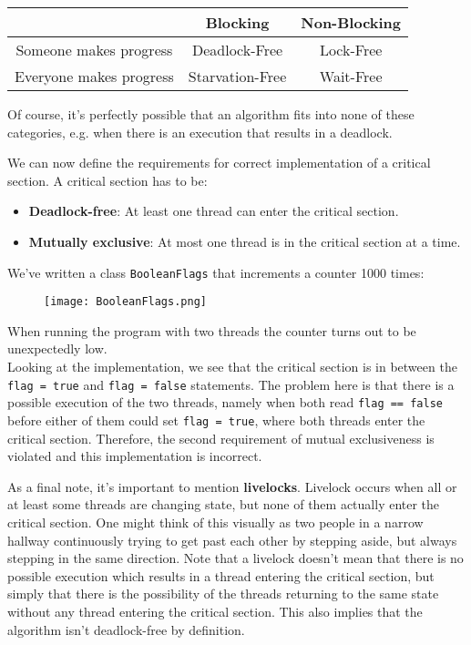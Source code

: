 \documentclass[main]{subfiles}
\begin{document}
\begin{center}
    \begin{tabular}{c|c|c}
         &  Blocking & Non-Blocking\\
         \hline
        Someone makes progress & Deadlock-Free & Lock-Free \\
        \hline
        Everyone makes progress & Starvation-Free & Wait-Free
    \end{tabular}
\end{center}
\noindent Of course, it's perfectly possible that an algorithm fits into none of these categories, e.g. when there is an execution that results in a deadlock.\clearpage

\noindent We can now define the requirements for correct implementation of a critical section. A critical section has to be:
\begin{itemize}
    \item \textbf{Deadlock-free}: At least one thread can enter the critical section.
    \item \textbf{Mutually exclusive}: At most one thread is in the critical section at a time.
\end{itemize}

\begin{example}
    We've written a class \texttt{BooleanFlags} that increments a counter 1000 times:
    \begin{figure}[H]
        \centering
        \texttt{[image: BooleanFlags.png]}
    \end{figure}
    \noindent When running the program with two threads the counter turns out to be unexpectedly low.\\[3mm]
    Looking at the implementation, we see that the critical section is in between the \texttt{flag = true} and \texttt{flag = false} statements. The problem here is that there is a possible execution of the two threads, namely when both read \texttt{flag == false} before either of them could set \texttt{flag = true}, where both threads enter the critical section. Therefore, the second requirement of mutual exclusiveness is violated and this implementation is incorrect. 
\end{example}

\noindent As a final note, it's important to mention \textbf{livelocks}. Livelock occurs when all or at least some threads are changing state, but none of them actually enter the critical section. One might think of this visually as two people in a narrow hallway continuously trying to get past each other by stepping aside, but always stepping in the same direction. Note that a livelock doesn't mean that there is no possible execution which results in a thread entering the critical section, but simply that there is the possibility of the threads returning to the same state without any thread entering the critical section. This also implies that the algorithm isn't deadlock-free by definition.\\
\end{document}
